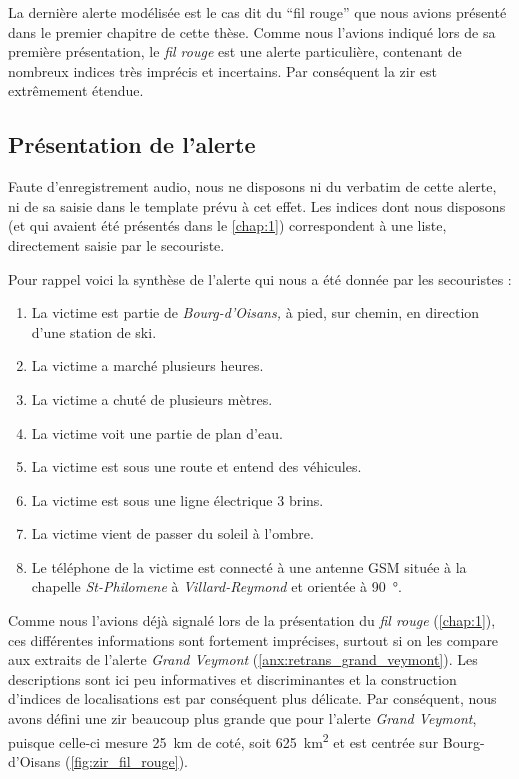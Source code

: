 La dernière alerte modélisée est le cas dit du \enquote{fil rouge} que
nous avions présenté dans le premier chapitre de cette thèse. Comme
nous l'avions indiqué lors de sa première présentation, le \emph{fil
  rouge} est une alerte particulière, contenant de nombreux indices
très imprécis et incertains. Par conséquent la \ac{zir} est
extrêmement étendue.


\subsection{Présentation de l'alerte}
\label{subsec:9-4-1}

Faute d'enregistrement audio, nous ne disposons ni du verbatim de
cette alerte, ni de sa saisie dans le template prévu à cet effet. Les
indices dont nous disposons (et qui avaient été présentés dans le
\autoref{chap:1}) correspondent à une liste, directement saisie par
le secouriste. 

Pour rappel voici la synthèse de l'alerte qui nous a été donnée par
les secouristes :
%
\begin{enumerate}
\item La victime est partie de \emph{Bourg-d'Oisans,} à pied, sur
  chemin, en direction d'une station de ski.
\item La victime a marché plusieurs heures.
\item La victime a chuté de plusieurs mètres.
\item La victime voit une partie de plan d'eau.
\item La victime est sous une route et entend des véhicules.
\item La victime est sous une ligne électrique 3 brins.
\item La victime vient de passer du soleil à l'ombre.
\item Le téléphone de la victime est connecté à une antenne GSM située
  à la chapelle \emph{St-Philomene} à \emph{Villard-Reymond} et
  orientée à \SI{90}{\degree}.
\end{enumerate}

Comme nous l'avions déjà signalé lors de la présentation du \emph{fil
  rouge} (\autoref{chap:1}), ces différentes informations sont
fortement imprécises, surtout si on les compare aux extraits de
l'alerte \emph{Grand Veymont}
(\autoref{anx:retrans_grand_veymont}). Les descriptions sont ici peu
informatives et discriminantes et la construction d'indices de
localisations est par conséquent plus délicate. Par conséquent, nous
avons défini une \ac{zir} beaucoup plus grande que pour l'alerte
\emph{Grand Veymont}, puisque celle-ci mesure \SI{25}{\kilo\meter} de
coté, soit \SI{625}{\kilo\meter\squared} et est centrée sur
Bourg-d'Oisans (\autoref{fig:zir_fil_rouge}).

